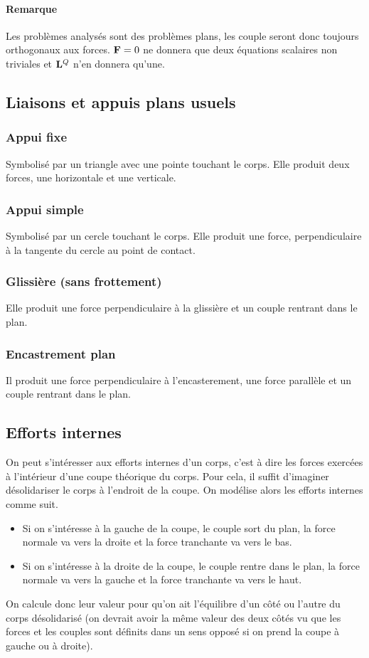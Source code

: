 \paragraph{Remarque}
Les problèmes analysés sont des problèmes plans, les couple seront donc toujours orthogonaux aux forces.
${\bf F} = 0$ ne donnera que deux équations scalaires non triviales et ${\bf L}^Q$ n'en donnera qu'une.

\subsection{Liaisons et appuis plans usuels}
\subsubsection{Appui fixe}
Symbolisé par un triangle avec une pointe touchant le corps.
Elle produit deux forces, une horizontale et une verticale.

\subsubsection{Appui simple}
Symbolisé par un cercle touchant le corps.
Elle produit une force, perpendiculaire à la tangente du cercle au point de contact.

\subsubsection{Glissière (sans frottement)}
Elle produit une force perpendiculaire à la glissière et un couple rentrant dans le plan.

\subsubsection{Encastrement plan}
Il produit une force perpendiculaire à l'encasterement, une force parallèle et un couple rentrant dans le plan.

\subsection{Efforts internes}
On peut s'intéresser aux efforts internes d'un corps, c'est à dire les forces exercées à l'intérieur d'une coupe théorique du corps.
Pour cela, il suffit d'imaginer désolidariser le corps à l'endroit de la coupe.
On modélise alors les efforts internes comme suit.
\begin{itemize}
  \item Si on s'intéresse à la gauche de la coupe, le couple sort du plan, la force normale va vers la droite et la force tranchante va vers le bas.
  \item Si on s'intéresse à la droite de la coupe, le couple rentre dans le plan, la force normale va vers la gauche et la force tranchante va vers le haut.
\end{itemize}
On calcule donc leur valeur pour qu'on ait l'équilibre d'un côté ou l'autre du corps désolidarisé (on devrait avoir la même valeur des deux côtés vu que les forces et les couples sont définits dans un sens opposé si on prend la coupe à gauche ou à droite).


